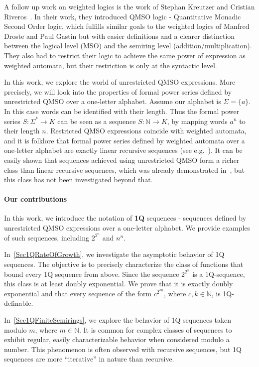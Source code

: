 \documentclass[en]{pracamgr}
\theoremstyle{definition}
\begin{document}
A follow up work on weighted logics is the work of Stephan Kreutzer and Cristian Riveros~\cite{KreutzerR13}. In their work, they introduced QMSO logic - Quantitative Monadic Second Order logic, which fulfills similar goals to the weighted logics of Manfred Droste and Paul Gastin but with easier definitions and a clearer distinction between the logical level (MSO) and the semiring level (addition/multiplication). They also had to restrict their logic to achieve the same power of expression as weighted automata, but their restriction is only at the syntactic level.

In this work, we explore the world of unrestricted QMSO expressions. More precisely, we will look into the properties of formal power series defined by unrestricted QMSO over a one-letter alphabet. Assume our alphabet is $\Sigma = \{a\}$. In this case words can be identified with their length. Thus the formal power series $S: \Sigma^* \rightarrow K$ can be seen as a sequence $S: \mathbb{N} \rightarrow K$, by mapping words $a^n$ to their length $n$. Restricted QMSO expressions coincide with weighted automata, and it is folklore that formal power series defined by weighted automata over a one-letter alphabet are exactly linear recursive sequences (see e.g.~\cite{BarloyFLM22}). It can be easily shown that sequences achieved using unrestricted QMSO form a richer class than linear recursive sequences, which was already demonstrated in~\cite{CadilhacMPPS20}, but this class has not been investigated beyond that.

\paragraph*{Our contributions}
\label{ourcontrib}
In this work, we introduce the notation of \textbf{1Q} sequences - sequences defined by unrestricted QMSO expressions over a one-letter alphabet. We provide examples of such sequences, including $2^{2^n}$ and $n^n$.

In~\cref{Sec1QRateOfGrowth}, we investigate the asymptotic behavior of 1Q sequences. The objective is to precisely characterize the class of functions that bound every 1Q sequence from above. Since the sequence $2^{2^n}$ is a 1Q-sequence, this class is at least doubly exponential. We prove that it is exactly doubly exponential and that every sequence of the form $c^{2^{kn}}$, where $c, k \in \mathbb{N}$, is 1Q-definable.

In~\cref{Sec1QFiniteSemirings}, we explore the behavior of 1Q sequences taken modulo $m$, where $m \in \mathbb{N}$. It is common for complex classes of sequences to exhibit regular, easily characterizable behavior when considered modulo a number. This phenomenon is often observed with recursive sequences, but 1Q sequences are more ``iterative'' in nature than recursive.
\end{document}
